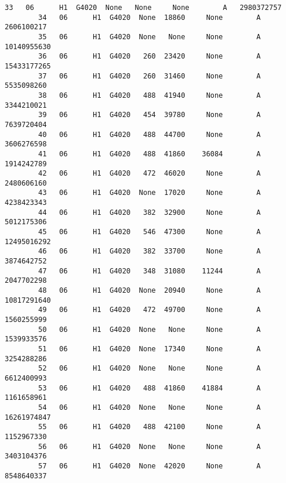 \documentclass[11pt]{article}
\begin{document}
\begin{Verbatim}[commandchars=\\\{\}]
        33   06      H1  G4020  None   None     None        A   2980372757   
        34   06      H1  G4020  None  18860     None        A   2606100217   
        35   06      H1  G4020  None   None     None        A  10140955630   
        36   06      H1  G4020   260  23420     None        A  15433177265   
        37   06      H1  G4020   260  31460     None        A   5535098260   
        38   06      H1  G4020   488  41940     None        A   3344210021   
        39   06      H1  G4020   454  39780     None        A   7639720404   
        40   06      H1  G4020   488  44700     None        A   3606276598   
        41   06      H1  G4020   488  41860    36084        A   1914242789   
        42   06      H1  G4020   472  46020     None        A   2480606160   
        43   06      H1  G4020  None  17020     None        A   4238423343   
        44   06      H1  G4020   382  32900     None        A   5012175306   
        45   06      H1  G4020   546  47300     None        A  12495016292   
        46   06      H1  G4020   382  33700     None        A   3874642752   
        47   06      H1  G4020   348  31080    11244        A   2047702298   
        48   06      H1  G4020  None  20940     None        A  10817291640   
        49   06      H1  G4020   472  49700     None        A   1560255999   
        50   06      H1  G4020  None   None     None        A   1539933576   
        51   06      H1  G4020  None  17340     None        A   3254288286   
        52   06      H1  G4020  None   None     None        A   6612400993   
        53   06      H1  G4020   488  41860    41884        A   1161658961   
        54   06      H1  G4020  None   None     None        A  16261974847   
        55   06      H1  G4020   488  42100     None        A   1152967330   
        56   06      H1  G4020  None   None     None        A   3403104376   
        57   06      H1  G4020  None  42020     None        A   8548640337   
        

\end{Verbatim}
\end{document}
